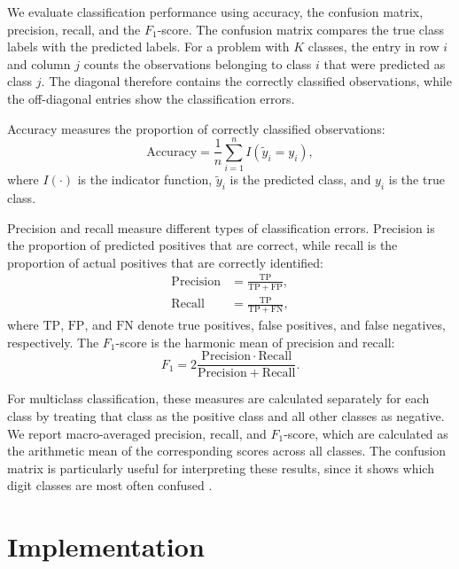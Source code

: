 \documentclass[amssymb,secnumarabic,twocolumn,aps]{revtex4}
\begin{document}
We evaluate classification performance using accuracy, the confusion matrix, precision, recall, and the $F_1$-score. The confusion matrix compares the true class labels with the predicted labels. For a problem with $K$ classes, the entry in row $i$ and column $j$ counts the observations belonging to class $i$ that were predicted as class $j$. The diagonal therefore contains the correctly classified observations, while the off-diagonal entries show the classification errors.

Accuracy measures the proportion of correctly classified observations:
\begin{equation*}
    \mathrm{Accuracy}
    =\frac{1}{n}\sum_{i=1}^{n}
    I(\tilde{y}_i=y_i),
\end{equation*}
where $I(\cdot)$ is the indicator function, $\tilde{y}_i$ is the predicted class, and $y_i$ is the true class.

Precision and recall measure different types of classification errors. Precision is the proportion of predicted positives that are correct, while recall is the proportion of actual positives that are correctly identified:
\begin{align*}
    \mathrm{Precision}
     & =\frac{\mathrm{TP}}{\mathrm{TP}+\mathrm{FP}}, \\
    \mathrm{Recall}
     & =\frac{\mathrm{TP}}{\mathrm{TP}+\mathrm{FN}},
\end{align*}
where $\mathrm{TP}$, $\mathrm{FP}$, and $\mathrm{FN}$ denote true positives, false positives, and false negatives, respectively. The $F_1$-score is the harmonic mean of precision and recall:
\begin{equation*}
    F_1=
    2\frac{\mathrm{Precision}\cdot\mathrm{Recall}}
    {\mathrm{Precision}+\mathrm{Recall}}.
\end{equation*}

For multiclass classification, these measures are calculated separately for each class by treating that class as the positive class and all other classes as negative. We report macro-averaged precision, recall, and $F_1$-score, which are calculated as the arithmetic mean of the corresponding scores across all classes. The confusion matrix is particularly useful for interpreting these results, since it shows which digit classes are most often confused \cite{lecturebook}.


\section{Implementation}\label{section:Implementation}
\end{document}
